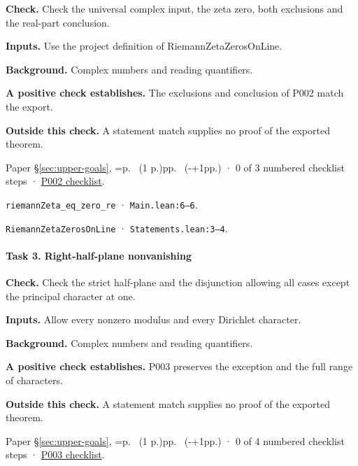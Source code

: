 \textbf{Check.} Check the universal complex input, the zeta zero, both exclusions and the real-part conclusion.

\textbf{Inputs.} Use the project definition of RiemannZetaZerosOnLine.

\textbf{Background.} Complex numbers and reading quantifiers.

\textbf{A positive check establishes.} The exclusions and conclusion of P002 match the export.

\textbf{Outside this check.} A statement match supplies no proof of the exported theorem.

Paper \S\ref{sec:upper-goals}, \ifnum{}=\relax p.\ \pageref{pn:P002} (1 p.)\else pp.\ \pageref{pn:P002} (\number\numexpr{}-+1\relax pp.)\fi{} · 0 of 3 numbered checklist steps · \href{https://github.com/GunheeC/rh-lean-verification-atlas/blob/v0.1.0/units/P002.check.md}{P002 checklist}.

\nolinkurl{riemannZeta_eq_zero_re} · \nolinkurl{Main.lean:6–6}.

\nolinkurl{RiemannZetaZerosOnLine} · \nolinkurl{Statements.lean:3–4}.

\paragraph{Task 3. Right-half-plane nonvanishing}\label{v7:task-3}

\textbf{Check.} Check the strict half-plane and the disjunction allowing all cases except the principal character at one.

\textbf{Inputs.} Allow every nonzero modulus and every Dirichlet character.

\textbf{Background.} Complex numbers and reading quantifiers.

\textbf{A positive check establishes.} P003 preserves the exception and the full range of characters.

\textbf{Outside this check.} A statement match supplies no proof of the exported theorem.

Paper \S\ref{sec:upper-goals}, \ifnum{}=\relax p.\ \pageref{pn:P003} (1 p.)\else pp.\ \pageref{pn:P003} (\number\numexpr{}-+1\relax pp.)\fi{} · 0 of 4 numbered checklist steps · \href{https://github.com/GunheeC/rh-lean-verification-atlas/blob/v0.1.0/units/P003.check.md}{P003 checklist}.

